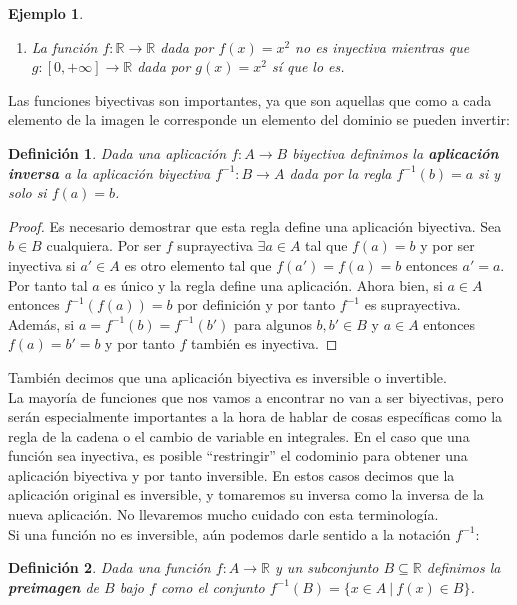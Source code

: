 \documentclass{article}
\newtheorem{define}{Definición}
\newtheorem{ejem}{Ejemplo}
\newcommand{\reales}{\mathbb{R}}
\begin{document}
\begin{ejem}
	\begin{enumerate}
		\item
		La función $f: \reales \rightarrow \reales$ dada por $f(x) = x^2$ no es inyectiva mientras que $g: [0, +\infty] \rightarrow \reales$ dada por $g(x) = x^2$ sí que lo es.
	\end{enumerate}
\end{ejem}

Las funciones biyectivas son importantes, ya que son aquellas que como a cada elemento de la imagen le corresponde un elemento del dominio se pueden invertir:
\begin{define}
	Dada una aplicación $f: A \rightarrow B$ biyectiva definimos la \textbf{aplicación inversa} a la aplicación biyectiva $f^{-1}: B \rightarrow A$ dada por la regla $f^{-1}(b) = a$ si y solo si $f(a) = b$.
\end{define}
\begin{proof}
	Es necesario demostrar que esta regla define una aplicación biyectiva. Sea $b \in B$ cualquiera. Por ser $f$ suprayectiva $\exists a \in A$ tal que $f(a) = b$ y por ser inyectiva si $a' \in A$ es otro elemento tal que $f(a') = f(a) = b$ entonces $a' = a$. Por tanto tal $a$ es único y la regla define una aplicación. Ahora bien, si $a \in A$ entonces $f^{-1}(f(a)) = b$ por definición y por tanto $f^{-1}$ es suprayectiva. Además, si $a = f^{-1}(b) = f^{-1}(b')$ para algunos $b, b' \in B$ y $a \in A$ entonces $f(a) = b' = b$ y por tanto $f$ también es inyectiva.
\end{proof}

También decimos que una aplicación biyectiva es inversible o invertible.\\ 
La mayoría de funciones que nos vamos a encontrar no van a ser biyectivas, pero serán especialmente importantes a la hora de hablar de cosas específicas como la regla de la cadena o el cambio de variable en integrales. En el caso que una función sea inyectiva, es posible ``restringir'' el codominio para obtener una aplicación biyectiva y por tanto inversible. En estos casos decimos que la aplicación original es inversible, y tomaremos su inversa como la inversa de la nueva aplicación. No llevaremos mucho cuidado con esta terminología.\\ 
Si una función no es inversible, aún podemos darle sentido a la notación $f^{-1}$:

\begin{define}
	Dada una función $f: A \rightarrow \reales$ y un subconjunto $B \subseteq \reales$ definimos la \textbf{preimagen} de $B$ bajo $f$ como el conjunto $f^{-1}(B) = \{x \in A\ | \ f(x) \in B \}$.
\end{define}
\end{document}
